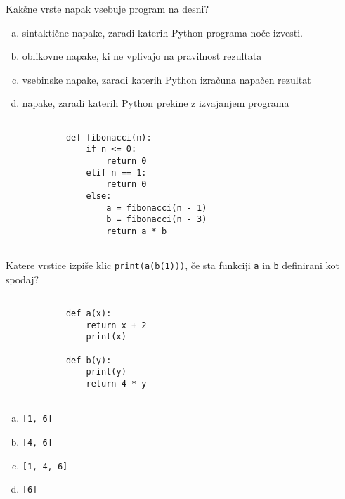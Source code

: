 \documentclass[arhiv, 10pt]{../izpit}
\newcommand{\inlinepy}[1]{\texttt{#1}}
\begin{document}
        \naloga*
        \begin{multicols}{2}
        \noindent
        Kakšne vrste napak vsebuje program na desni?

        \begin{enumerate}[(a)]
\item sintaktične napake, zaradi katerih Python programa noče izvesti.
\item oblikovne napake, ki ne vplivajo na pravilnost rezultata
\item vsebinske napake, zaradi katerih Python izračuna napačen rezultat
\item napake, zaradi katerih Python prekine z izvajanjem programa
\end{enumerate}

        \columnbreak

        \begin{verbatim}
        
            def fibonacci(n):
                if n <= 0:
                    return 0
                elif n == 1:
                    return 0
                else:
                    a = fibonacci(n - 1)
                    b = fibonacci(n - 3)
                    return a * b
            
        \end{verbatim}

        \end{multicols}

    
        \naloga*
        Katere vrstice izpiše klic \inlinepy{print(a(b(1)))}, če sta funkciji \inlinepy{a} in \inlinepy{b} definirani kot spodaj?

        \begin{multicols}{2}
        \begin{verbatim}
        
            def a(x):
                return x + 2
                print(x)

            def b(y):
                print(y)
                return 4 * y
        
        \end{verbatim}

        \begin{enumerate}[(a)]
\item \inlinepy{[1, 6]}
\item \inlinepy{[4, 6]}
\item \inlinepy{[1, 4, 6]}
\item \inlinepy{[6]}
\end{enumerate}

        \end{multicols}
    
\end{document}
